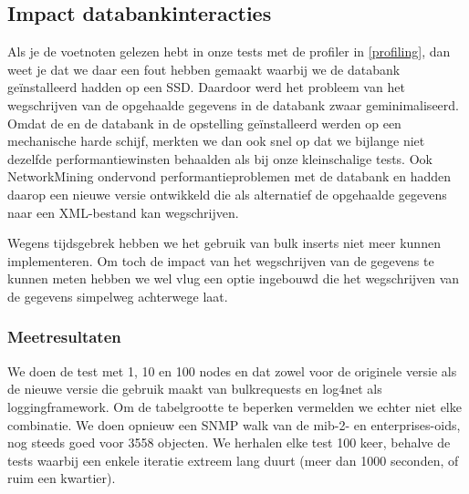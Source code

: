 \subsection{Impact databankinteracties}
\label{impact-db}

Als je de voetnoten gelezen hebt in onze tests met de profiler in \cref{profiling},
dan weet je dat we daar een fout hebben gemaakt waarbij we de databank geïnstalleerd hadden op een SSD.
Daardoor werd het probleem van het wegschrijven van de opgehaalde gegevens in de databank zwaar geminimaliseerd.
Omdat de \nwmretriever{} en de databank in de \vwall{}opstelling geïnstalleerd werden op een mechanische harde schijf,
merkten we dan ook snel op dat we bijlange niet dezelfde performantiewinsten behaalden als bij onze kleinschalige tests.
Ook NetworkMining ondervond performantieproblemen met de databank en hadden daarop een nieuwe versie ontwikkeld die als alternatief
de opgehaalde gegevens naar een XML-bestand kan wegschrijven.

Wegens tijdsgebrek hebben we het gebruik van bulk inserts niet meer kunnen implementeren.
Om toch de impact van het wegschrijven van de gegevens te kunnen meten hebben we wel vlug een optie ingebouwd
die het wegschrijven van de gegevens simpelweg achterwege laat.

\subsubsection{Meetresultaten}

We doen de test met 1, 10 en 100 nodes en dat zowel voor de originele versie als de nieuwe versie die gebruik maakt van bulkrequests en log4net als loggingframework.
Om de tabelgrootte te beperken vermelden we echter niet elke combinatie.
We doen opnieuw een SNMP walk van de mib-2- en enterprises-\glspl{oid}, nog steeds goed voor 3558 objecten.
We herhalen elke test 100 keer, behalve de tests waarbij een enkele iteratie extreem lang duurt (meer dan 1000 seconden, of ruim een kwartier).

